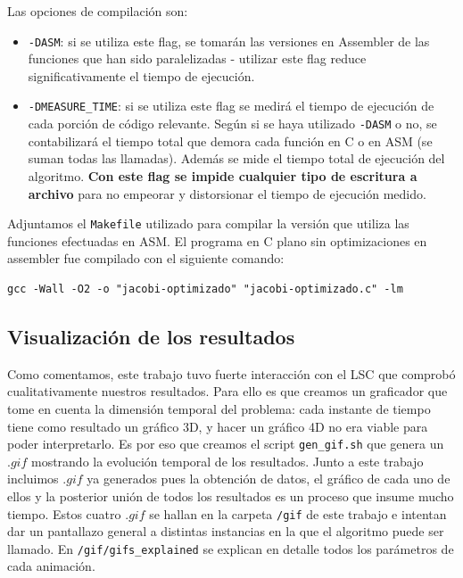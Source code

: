 \documentclass[a4paper]{article}
\begin{document}
Las opciones de compilación son:

\begin{itemize}
\item \texttt{-DASM}: si se utiliza este flag, se tomarán las versiones
en Assembler de las funciones que han sido paralelizadas - utilizar este
flag reduce significativamente el tiempo de ejecución.
\item \texttt{-DMEASURE\_TIME}: si se utiliza este flag se medirá el tiempo
de ejecución de cada porción de código relevante. Según si se haya utilizado
\texttt{-DASM} o no, se contabilizará el tiempo total que demora cada función en C
o en ASM (se suman todas las llamadas). Además se mide el tiempo total
de ejecución del algoritmo. \textbf{Con este flag se impide cualquier tipo de
escritura a archivo} para no empeorar y distorsionar el tiempo de ejecución
medido.
\end{itemize}

Adjuntamos el \texttt{Makefile} utilizado para compilar la versión que
utiliza las funciones efectuadas en ASM. El programa en C plano sin
optimizaciones en assembler fue compilado con el siguiente comando:

\begin{center}
\begin{verbatim}
gcc -Wall -O2 -o "jacobi-optimizado" "jacobi-optimizado.c" -lm
\end{verbatim}
\end{center}

\subsection{Visualización de los resultados}

Como comentamos, este trabajo tuvo fuerte interacción con el LSC que
comprobó cualitativamente nuestros resultados. Para ello es que creamos
un graficador que tome en cuenta la dimensión temporal del problema: 
cada instante de tiempo tiene como resultado un gráfico 3D, y hacer un
gráfico 4D no era viable para poder interpretarlo. Es por eso que
creamos el script \texttt{gen\_gif.sh} que genera un $.gif$ mostrando
la evolución temporal de los resultados. Junto a este trabajo incluimos 
$.gif$ ya generados pues la obtención de datos, el gráfico de cada uno de
ellos y la posterior unión de todos los resultados es un proceso que 
insume mucho tiempo. Estos cuatro $.gif$ se hallan en la carpeta \texttt{/gif}
de este trabajo e intentan dar un pantallazo general a distintas instancias
en la que el algoritmo puede ser llamado. En \texttt{/gif/gifs\_explained}
se explican en detalle todos los parámetros de cada animación.
\end{document}

